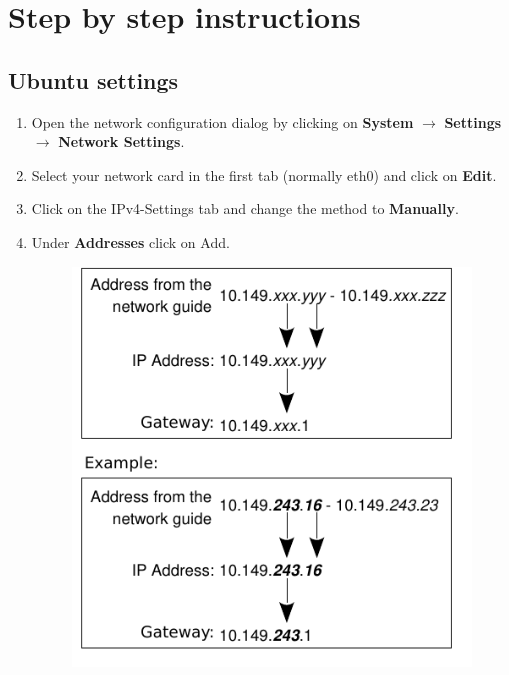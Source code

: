 \documentclass[a4paper,12pt]{scrartcl}
\newcommand{\optemph}[1]{\textbf{#1}}
\begin{document}
\section*{Step by step instructions}
\subsection*{Ubuntu settings}
\begin{enumerate}
	\item Open the network configuration dialog by clicking on \optemph{System} $\rightarrow$ \optemph{Settings} $\rightarrow$ \optemph{Network Settings}.
	\item Select your network card in the first tab (normally eth0) and click on \optemph{Edit}.
	\item Click on the IPv4-Settings tab and change the method to \optemph{Manually}.
	\item Under \optemph{Addresses} click on Add.
      \begin{figure}[h!]
        \centering
        \begin{minipage}[c]{0.45\linewidth}
          \centering
          \includegraphics[width=\linewidth,keepaspectratio]{Bilder/IP_Gerneric_EN}
        \end{minipage}
        \begin{minipage}[c]{0.5\linewidth}

\end{minipage}
\end{figure}
\end{enumerate}
\end{document}
